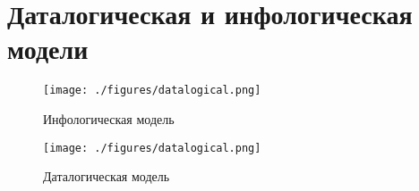 \section{Даталогическая и инфологическая модели}

\begin{figure}[h!]
	\centering
	\texttt{[image: ./figures/datalogical.png]}
	\caption{Инфологическая модель}
\end{figure}

\begin{figure}[h!]
	\centering
	\texttt{[image: ./figures/datalogical.png]}
	\caption{Даталогическая модель}
\end{figure}
\clearpage


